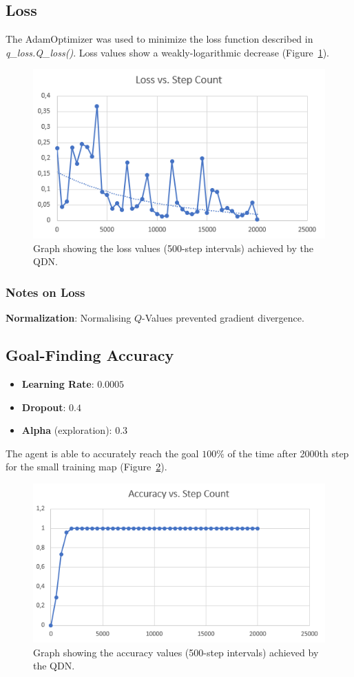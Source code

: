 \documentclass{article}
\begin{document}
\subsection{Loss}
The AdamOptimizer was used to minimize the loss function described in \textit{q\_loss.Q\_loss()}. Loss values show a weakly-logarithmic decrease (Figure~\ref{fig:loss}).
\begin{figure}[ht!]
\centering
  \includegraphics[width=0.8\linewidth]{loss}
  \caption{Graph showing the loss values (500-step intervals) achieved by the QDN.}
  \label{fig:loss}
\end{figure}

\subsubsection*{Notes on Loss}
\textbf{Normalization}: Normalising $Q$-Values prevented gradient divergence.

\subsection{Goal-Finding Accuracy}
\begin{itemize}
\item \textbf{Learning Rate}: $0.0005$
\item \textbf{Dropout}: $0.4$
\item \textbf{Alpha} (exploration): $0.3$
\end{itemize}

The agent is able to accurately reach the goal $100\%$ of the time after 2000th step for the small training map (Figure~\ref{fig:accuracy}).

\begin{figure}[ht!]
\centering
  \includegraphics[width=0.8\linewidth]{accuracy}
  \caption{Graph showing the accuracy values (500-step intervals) achieved by the QDN.}
  \label{fig:accuracy}
\end{figure}
\end{document}
